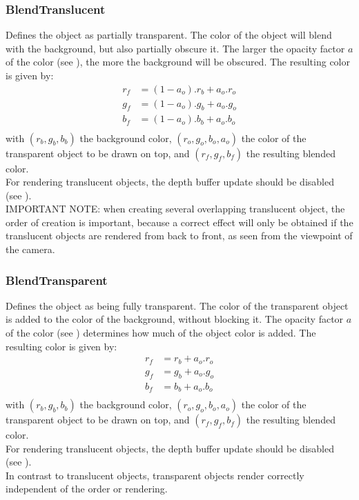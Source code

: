 \subsubsection{BlendTranslucent \label{T:BlendType|BlendTranslucent}}
Defines the object as partially transparent. The color of the object will blend with the background, but also partially obscure it. The larger the opacity factor $a$ of the color (see ), the more the background will be obscured. The resulting color is given by:
\begin{equation}
\begin{array}{rcl}
r_f & = (1-a_o) . r_b + a_o . r_o \\
g_f & = (1-a_o) . g_b + a_o . g_o \\
b_f & = (1-a_o) . b_b + a_o . b_o \\
\end{array}
\end{equation}
with $(r_b,g_b,b_b)$ the background color, $(r_o,g_o,b_o,a_o)$ the color of the transparent object to be drawn on top, and $(r_f,g_f,b_f)$ the resulting blended color. \\
For rendering translucent objects, the depth buffer update should be disabled (see ). \\
IMPORTANT NOTE: when creating several overlapping translucent object, the order of creation is important, because a correct effect will only be obtained if the translucent objects are rendered from back to front, as seen from the viewpoint of the camera.

\subsubsection{BlendTransparent \label{T:BlendType|BlendTransparent}}
Defines the object as being fully transparent. The color of the transparent object is added to the color of the background, without blocking it. The opacity factor $a$ of the color (see ) determines how much of the object color is added. The resulting color is given by:
\begin{equation}
\begin{array}{rcl}
r_f & = r_b + a_o . r_o \\
g_f & = g_b + a_o . g_o \\
b_f & = b_b + a_o . b_o \\
\end{array}
\end{equation}
with $(r_b,g_b,b_b)$ the background color, $(r_o,g_o,b_o,a_o)$ the color of the transparent object to be drawn on top, and $(r_f,g_f,b_f)$ the resulting blended color. \\
For rendering translucent objects, the depth buffer update should be disabled (see ). \\
In contrast to translucent objects, transparent objects render correctly independent of the order or rendering.

